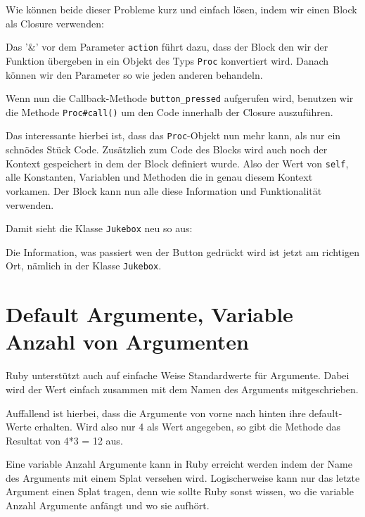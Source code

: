 \documentclass[a4book,11pt,twoside]{scrbook}
\begin{document}
Wie können beide dieser Probleme kurz und einfach lösen, indem wir einen Block als Closure verwenden:



Das '\&' vor dem Parameter \texttt{action} führt dazu, dass der Block den wir der Funktion übergeben in ein Objekt des Typs \texttt{Proc} konvertiert wird. Danach können wir den Parameter so wie jeden anderen behandeln.

Wenn nun die Callback-Methode \texttt{button\_pressed} aufgerufen wird, benutzen wir die Methode \texttt{Proc\#call()} um den Code innerhalb der Closure auszuführen.

Das interessante hierbei ist, dass das \texttt{Proc}-Objekt nun mehr kann, als nur ein schnödes Stück Code. Zusätzlich zum Code des Blocks wird auch noch der Kontext gespeichert in dem der Block definiert wurde. Also der Wert von \texttt{self}, alle Konstanten, Variablen und Methoden die in genau diesem Kontext vorkamen. Der Block kann nun alle diese Information und Funktionalität verwenden.

Damit sieht die Klasse \texttt{Jukebox} neu so aus:



Die Information, was passiert wen der Button gedrückt wird ist jetzt am richtigen Ort, nämlich in der Klasse \texttt{Jukebox}.





\section{Default Argumente, Variable Anzahl von Argumenten}
Ruby unterstützt auch auf einfache Weise Standardwerte für Argumente. Dabei wird der Wert einfach zusammen mit dem Namen des Arguments mitgeschrieben.



Auffallend ist hierbei, dass die Argumente von vorne nach hinten ihre default-Werte erhalten. Wird also nur 4 als Wert angegeben, so gibt die Methode das Resultat von 4*3 = 12 aus.


Eine variable Anzahl Argumente kann in Ruby erreicht werden indem der Name des Arguments mit einem Splat versehen wird. Logischerweise kann nur das letzte Argument einen Splat tragen, denn wie sollte Ruby sonst wissen, wo die variable Anzahl Argumente anfängt und wo sie aufhört.
\end{document}
